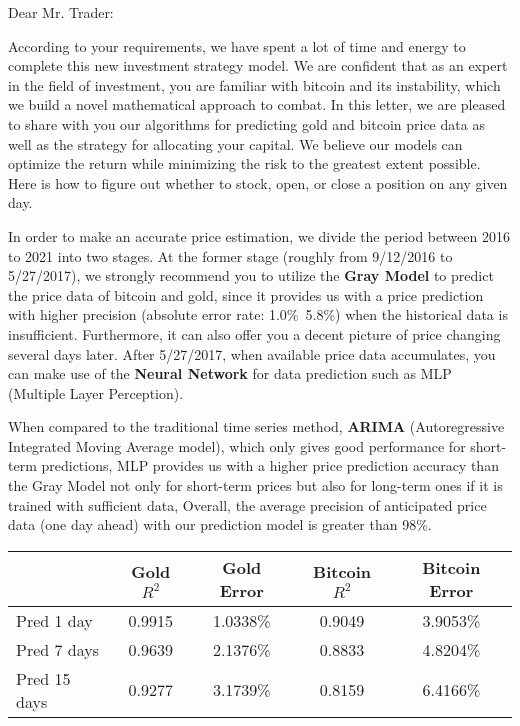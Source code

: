 \documentclass{mcmthesis}
\begin{document}
{	Dear Mr. Trader: 
	
	According to your requirements, we have spent a lot of time and energy to complete this new investment strategy model. We are confident that as an expert in the field of investment, you are familiar with bitcoin and its instability, which we build a novel mathematical approach to combat. In this letter, we are pleased to share with you our algorithms for predicting gold and bitcoin price data as well as the strategy for allocating your capital. We believe our models can optimize the return while minimizing the risk to the greatest extent possible. Here is how to figure out whether to stock, open, or close a position on any given day. 
	
	In order to make an accurate price estimation, we divide the period between 2016 to 2021 into two stages. At the former stage (roughly from 9/12/2016 to 5/27/2017), we strongly recommend you to utilize the \textbf{Gray Model} to predict the price data of bitcoin and gold, since it provides us with a price prediction with higher precision (absolute error rate: 1.0\%~5.8\%) when the historical data is insufficient. Furthermore, it can also offer you a decent picture of price changing several days later. After 5/27/2017, when available price data accumulates, you can make use of the \textbf{Neural Network} for data prediction such as MLP (Multiple Layer Perception). 
	
	When compared to the traditional time series method, \textbf{ARIMA} (Autoregressive Integrated Moving Average model), which only gives good performance for short-term predictions, MLP provides us with a higher price prediction accuracy than the Gray Model not only for short-term prices but also for long-term ones if it is trained with sufficient data, Overall, the average precision of anticipated price data (one day ahead) with our prediction model is greater than 98\%. 
	
	\begin{center}
		\begin{tabular}{l|cccc}
			\toprule
			& Gold $R^2$ & Gold Error & Bitcoin $R^2$ & Bitcoin Error \\ \midrule
			Pred 1 day & 0.9915 & 1.0338\% & 0.9049 & 3.9053\% \\
			Pred 7 days & 0.9639 & 2.1376\% & 0.8833 & 4.8204\% \\
			Pred 15 days & 0.9277 & 3.1739\% & 0.8159 & 6.4166\% \\
			\bottomrule
		\end{tabular}
	\end{center}
	
}
\end{document}
